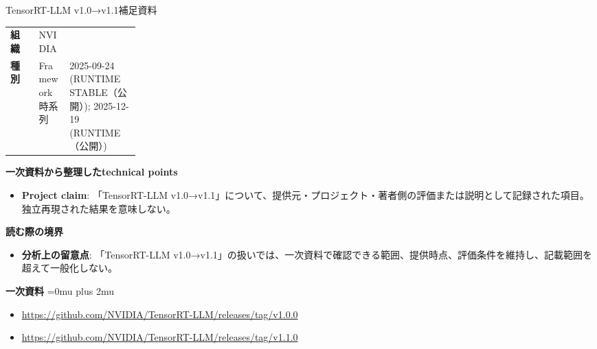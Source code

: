 \begin{technicalnote}{TensorRT-LLM v1.0→v1.1}{補足資料}
\begingroup
\begin{tabularx}{\linewidth}{@{}>{\bfseries}p{0.22\linewidth}X@{}}
組織 & NVIDIA \\
種別 & Framework
時系列 & 2025-09-24 (RUNTIME STABLE（公開）); 2025-12-19 (RUNTIME（公開）) \\
\end{tabularx}
\smallskip
{\bfseries 一次資料から整理したtechnical points}
\begin{itemize}[leftmargin=1.5em,itemsep=0.35em]
\item \textbf{Project claim}: 「TensorRT-LLM v1.0→v1.1」について、提供元・プロジェクト・著者側の評価または説明として記録された項目。独立再現された結果を意味しない。
\end{itemize}
\begin{minipage}{\linewidth}
{\bfseries 読む際の境界}
\begin{itemize}[leftmargin=1.5em,itemsep=0.35em]
\item \textbf{分析上の留意点}: 「TensorRT-LLM v1.0→v1.1」の扱いでは、一次資料で確認できる範囲、提供時点、評価条件を維持し、記載範囲を超えて一般化しない。
\end{itemize}
\begin{samepage}
{\bfseries 一次資料}
\begingroup\sloppy
\Urlmuskip=0mu plus 2mu\relax
\begin{itemize}[leftmargin=1.5em,itemsep=0.25em]
\item {\scriptsize\url{https://github.com/NVIDIA/TensorRT-LLM/releases/tag/v1.0.0}}
\item {\scriptsize\url{https://github.com/NVIDIA/TensorRT-LLM/releases/tag/v1.1.0}}
\end{itemize}
\endgroup
\end{samepage}
\end{minipage}
\endgroup
\end{technicalnote}
\medskip

